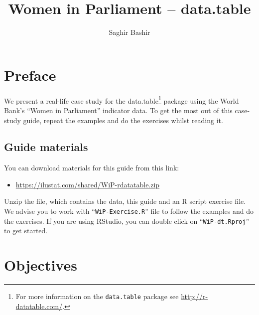 \documentclass[a4paper,9pt,twocolumn,twoside,printwatermark=true]{pinp}
\title{Women in Parliament -- data.table}
\author[]{Saghir Bashir}
\providecommand{\tightlist}{%
  \setlength{\itemsep}{0pt}\setlength{\parskip}{0pt}}
\begin{document}
\verticaladjustment{-2pt}

\maketitle
\thispagestyle{firststyle}



\section{Preface}\label{preface}

We present a real-life case study for the data.table\footnote{For more
  information on the \texttt{data.table} package see
  \url{http://r-datatable.com/}.} package using the World Bank's ``Women
in Parliament'' indicator data. To get the most out of this case-study
guide, repeat the examples and do the exercises whilst reading it.

\subsection{Guide materials}\label{guide-materials}

You can download materials for this guide from this link:

\begin{itemize}
\tightlist
\item
  \url{https://ilustat.com/shared/WiP-rdatatable.zip}
\end{itemize}

Unzip the file, which contains the data, this guide and an R script
exercise file. We advise you to work with ``\texttt{WiP-Exercise.R}''
file to follow the examples and do the exercises. If you are using
RStudio, you can double click on ``\texttt{WiP-dt.Rproj}'' to get
started.

\section{Objectives}\label{objectives}
\end{document}
